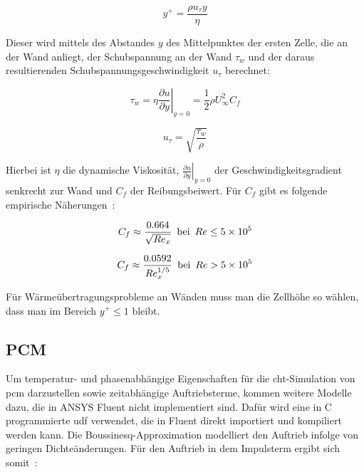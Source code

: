 \begin{equation}
  \label{eq:yplus}
  y^+ = \frac{\rho u_{\tau} y}{\eta}
\end{equation}

Dieser wird mittels des Abstandes $y$ des Mittelpunktes der ersten Zelle, die an der Wand anliegt, der Schubspannung an der Wand $\tau_w$ und der daraus resultierenden Schubspannungsgeschwindigkeit $u_{\tau}$ berechnet:

\noindent\begin{minipage}{.5\linewidth}
  \begin{equation}
    \label{eq:schubspannung}
    \tau_w = \eta \left.\frac{\partial u}{\partial y}\right|_{y=0} = \frac{1}{2} \rho U_{\infty}^{2} C_f
  \end{equation}
\end{minipage}%
\begin{minipage}{.5\linewidth}
  \begin{equation}
    \label{eq:schubspannung_geschwindigkeit}
    u_{\tau} = \sqrt{\frac{\tau_w}{\rho}}
  \end{equation}
\end{minipage}

Hierbei ist $\eta$ die dynamische Viskosität, $\left.\frac{\partial u}{\partial y}\right|_{y=0}$ der Geschwindigkeitsgradient senkrecht zur Wand
und $C_f$ der Reibungsbeiwert.
Für $C_f$ gibt es folgende empirische Näherungen~\cite{Anderson-2017}:

\begin{equation}
    \label{eq:reibungsbeiwert_laminar}
    C_f \approx \frac{0.664}{\sqrt{{Re}_x}} \hspace{0.5em} \mathrm{bei} \hspace{0.5em} Re \leq \SI{5e5}{}
\end{equation}

\begin{equation}
    \label{eq:reibungsbeiwert_turbulent}
    C_f \approx \frac{0.0592}{{Re}_x^{1/5}} \hspace{0.5em} \mathrm{bei} \hspace{0.5em} Re > \SI{5e5}{}
\end{equation}

Für Wärmeübertragungsprobleme an Wänden muss man die Zellhöhe so wählen, dass man im Bereich $y^+ \leq 1$ bleibt.

\subsection{PCM}\label{sec:pcm_grundlagen}
Um temperatur- und phasenabhängige Eigenschaften für die \ac{cht}-Simulation von \ac{pcm} darzustellen sowie zeitabhängige Auftriebsterme, kommen weitere Modelle dazu,
die in ANSYS Fluent nicht implementiert sind. Dafür wird eine in C programmierte \ac{udf} verwendet, die in Fluent direkt importiert
und kompiliert werden kann.
Die Boussinesq-Approximation modelliert den Auftrieb infolge von geringen Dichteänderungen. Für den Auftrieb
in dem Impulsterm ergibt sich somit~\cite{akamcae-udf}:


